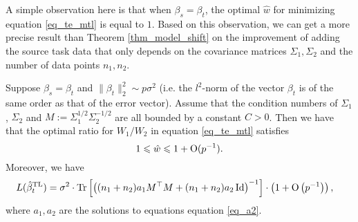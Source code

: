 A simple observation here is that when $\beta_s = \beta_t$, the optimal $\hat{w}$ for minimizing equation \eqref{eq_te_mtl} is equal to $1$.
Based on this observation, we can get a more precise result than Theorem \ref{thm_model_shift} on the improvement of adding the source task data that only depends on the covariance matrices $\Sigma_1, \Sigma_2$ and the number of data points $n_1, n_2$.



\begin{proposition}\label{thm_cov_shift}
Suppose $\beta_s = \beta_t$ and $\|\beta_t\|_2^2\sim p\sigma^2$ (i.e. the $l^2$-norm of the vector $\beta_t$ is of the same order as that of the error vector). Assume that the condition numbers of $\Sigma_1$, $\Sigma_2$ and $M:=\Sigma_1^{1/2}\Sigma_2^{-1/2}$ are all bounded by a constant $C>0$. Then we have that the optimal ratio for $W_1/W_2$ in equation \eqref{eq_te_mtl} satisfies
	$$1\leqslant \hat{w} \leqslant 1+\operatorname{O}(p^{-1}).$$%
Moreover, we have
	\begin{align}\label{tehatw1}
		L(\hat{\beta}^{\text{TL}}_{t}) &= \sigma^2 \cdot \operatorname{Tr}\left[\left({(n_1 + n_2)a_1 M^\top M  + (n_1 + n_2)a_2\operatorname{Id}}\right)^{-1}\right] \cdot \left(1+ \operatorname{O}\left(p^{-1}\right)\right),
	\end{align}
where $a_1, a_2$ are the solutions to equations equation \eqref{eq_a2}. %
\end{proposition}


